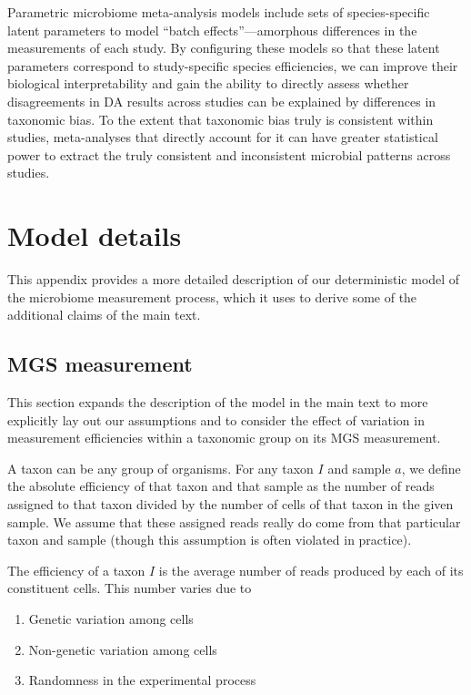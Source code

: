 \documentclass[
]{article}
\providecommand{\tightlist}{%
  \setlength{\itemsep}{0pt}\setlength{\parskip}{0pt}}
\begin{document}
Parametric microbiome meta-analysis models include sets of species-specific latent parameters to model ``batch effects''---amorphous differences in the measurements of each study.
By configuring these models so that these latent parameters correspond to study-specific species efficiencies, we can improve their biological interpretability and gain the ability to directly assess whether disagreements in DA results across studies can be explained by differences in taxonomic bias.
To the extent that taxonomic bias truly is consistent within studies, meta-analyses that directly account for it can have greater statistical power to extract the truly consistent and inconsistent microbial patterns across studies.

\hypertarget{appendix-appendix}{%
\appendix {}}


\hypertarget{model-details}{%
\section{Model details}\label{model-details}}

This appendix provides a more detailed description of our deterministic model of the microbiome measurement process, which it uses to derive some of the additional claims of the main text.

\hypertarget{mgs-measurement}{%
\subsection{MGS measurement}\label{mgs-measurement}}

This section expands the description of the model in the main text to more explicitly lay out our assumptions and to consider the effect of variation in measurement efficiencies within a taxonomic group on its MGS measurement.

A taxon can be any group of organisms.
For any taxon \(I\) and sample \(a\), we define the absolute efficiency of that taxon and that sample as the number of reads assigned to that taxon divided by the number of cells of that taxon in the given sample.
We assume that these assigned reads really do come from that particular taxon and sample (though this assumption is often violated in practice).

The efficiency of a taxon \(I\) is the average number of reads produced by each of its constituent cells.
This number varies due to

\begin{enumerate}
\def\labelenumi{\arabic{enumi}.}
\tightlist
\item
  Genetic variation among cells
\item
  Non-genetic variation among cells
\item
  Randomness in the experimental process
\end{enumerate}
\end{document}
